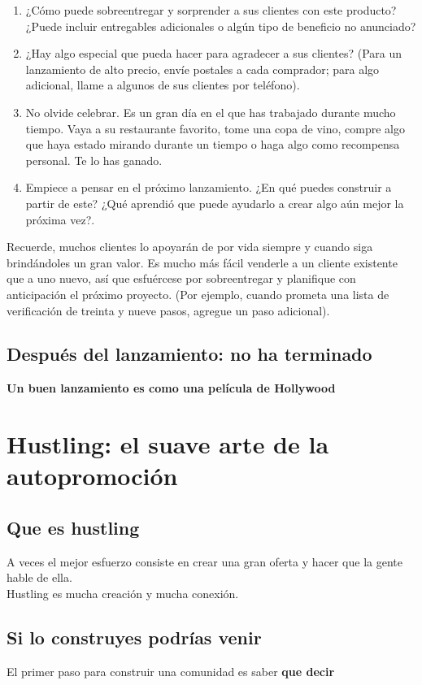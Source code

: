 \documentclass[10pt]{book}
\begin{document}
\begin{enumerate}[\bfseries 1.]
		\item ¿Cómo puede sobreentregar y sorprender a sus clientes con este producto? ¿Puede incluir entregables adicionales o algún tipo de beneficio no anunciado?
		\item ¿Hay algo especial que pueda hacer para agradecer a sus clientes? (Para un lanzamiento de alto precio, envíe postales a cada comprador; para algo adicional, llame a algunos de sus clientes por teléfono).
		\item No olvide celebrar. Es un gran día en el que has trabajado durante mucho tiempo. Vaya a su restaurante favorito, tome una copa de vino, compre algo que haya estado mirando durante un tiempo o haga algo como recompensa personal. Te lo has ganado.
		\item Empiece a pensar en el próximo lanzamiento. ¿En qué puedes construir a partir de este? ¿Qué aprendió que puede ayudarlo a crear algo aún mejor la próxima vez?.

	\end{enumerate}
	    Recuerde, muchos clientes lo apoyarán de por vida siempre y cuando siga brindándoles un gran valor. Es mucho más fácil venderle a un cliente existente que a uno nuevo, así que esfuércese por sobreentregar y planifique con anticipación el próximo proyecto. (Por ejemplo, cuando prometa una lista de verificación de treinta y nueve pasos, agregue un paso adicional).

    \section{Después del lanzamiento: no ha terminado}
    \textbf{Un buen lanzamiento es como una película de Hollywood}

    \chapter{Hustling: el suave arte de la autopromoción}
	\section{Que es hustling} 
	    A veces el mejor esfuerzo consiste en crear una gran oferta y hacer que la gente hable de ella.\\
	    Hustling es mucha creación y mucha conexión.

	\section{Si lo construyes podrías venir}	
	    El primer paso para construir una comunidad es saber \textbf{que decir}
\end{document}
